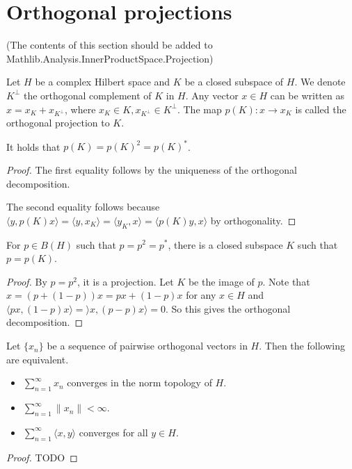 %

\section{Orthogonal projections}
(The contents of this section should be added to Mathlib.Analysis.InnerProductSpace.Projection)

Let $H$ be a complex Hilbert space and $K$ be a closed subspace of $H$.
We denote $K^\perp$ the orthogonal complement of $K$ in $H$.
Any vector $x \in H$ can be written as $x = x_K + x_{K^\perp}$, where $x_K \in K, x_{K^\perp} \in K^\perp$.
The map $p(K) : x \to x_K$ is called the orthogonal projection to $K$.
\begin{lemma}
 It holds that $p(K) = p(K)^2 = p(K)^*$.
\end{lemma}
\begin{proof}
 The first equality follows by the uniqueness of the orthogonal decomposition.

 The second equality follows because $\langle y, p(K)x \rangle = \langle y, x_K\rangle = \langle y_K, x \rangle = \langle p(K)y, x\rangle$
 by orthogonality.
\end{proof}

\begin{lemma}
 For $p \in B(H)$ such that $p = p^2 = p^*$,
 there is a closed subspace $K$ such that $p = p(K)$.
\end{lemma}
\begin{proof}
 By $p = p^2$, it is a projection. Let $K$ be the image of $p$.
 Note that $x = (p + (1-p))x = px + (1-p)x$ for any $x \in H$
 and $\langle px, (1-p)x\rangle = \rangle x, (p-p)x\rangle = 0$.
 So this gives the orthogonal decomposition.
\end{proof}

\begin{lemma}[12.6]
 Let $\{x_n\}$ be a sequence of pairwise orthogonal vectors in $H$.
 Then the following are equivalent.
 \begin{itemize}
  \item $\sum_{n=1}^\infty x_n$ converges in the norm topology of $H$.
  \item $\sum_{n=1}^\infty \|x_n\| < \infty$.
  \item $\sum_{n=1}^\infty \langle x, y\rangle$ converges for all $y \in H$.
 \end{itemize}
\end{lemma}
\begin{proof}
 TODO
\end{proof}

